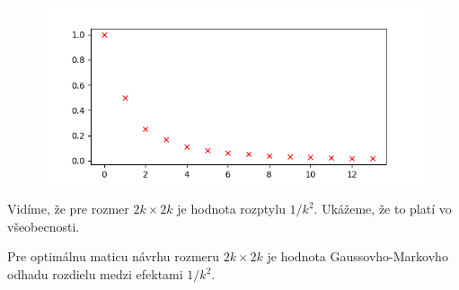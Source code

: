 \begin{figure}[!h]
  \centering
  \includegraphics{minimalny_rozptyl.png}
\end{figure}

Vidíme, že pre rozmer $2k \times 2k$ je hodnota rozptylu $1/k^2$. Ukážeme, že to platí vo všeobecnosti.

\begin{prop}
Pre optimálnu maticu návrhu rozmeru $2k \times 2k$ je hodnota Gaussovho-Markovho odhadu rozdielu medzi efektami $1/k^2$.
\end{prop}


